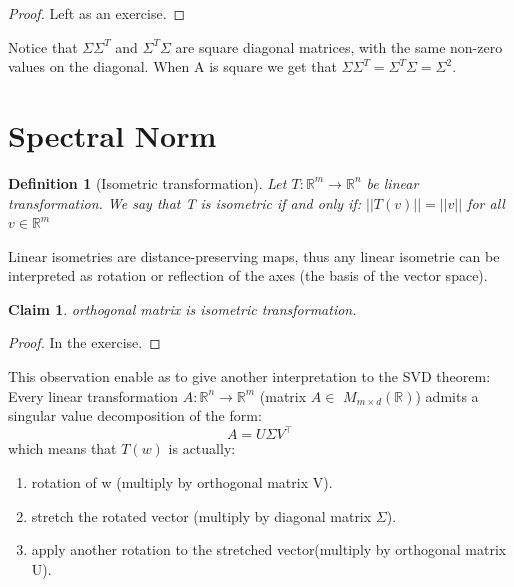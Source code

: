 \documentclass[11pt, oneside]{article}   	%
\newtheorem{definition}[lemma]{Definition}
\newtheorem{claim}[lemma]{Claim}
\begin{document}
\begin{proof}
Left as an exercise.
\end{proof}

Notice that $\Sigma\Sigma^{T}$ and $\Sigma^{T}\Sigma$ are square diagonal matrices, with the same non-zero values on the diagonal. When A is square we get that $\Sigma\Sigma^{T}=\Sigma^{T}\Sigma=\Sigma^{2}$.

\section{Spectral Norm}

\begin{definition}[Isometric transformation]
Let $T:\mathbb{R}^{m}\rightarrow\mathbb{R}^{n}$ be linear transformation. We say that T is isometric if and only if: $||T(v)||=||v||$ for all $v\in \mathbb{R}^{m}$ 
\end{definition}

Linear isometries are distance-preserving maps, thus any linear isometrie can be interpreted as rotation or reflection of the axes (the basis of the vector space).

\begin{claim}
orthogonal matrix is isometric transformation.
\end{claim}

\begin{proof}
In the exercise.
\end{proof}

This observation enable as to give another interpretation to the SVD theorem:
Every linear transformation $A:\mathbb{R}^{n}\rightarrow\mathbb{R}^{m}$ (matrix $A\in$ $M_{m\times d}(\mathbb{R})$) admits a singular value decomposition of the form:
$$A=U\Sigma V^{\top}$$
which means that $T(w)$ is actually:
\begin{enumerate}
    \item rotation of w (multiply by orthogonal matrix V).
    \item stretch the rotated vector (multiply by diagonal matrix $\Sigma$).
    \item apply another rotation to the stretched vector(multiply by orthogonal matrix U).
\end{enumerate}  
\end{document}

